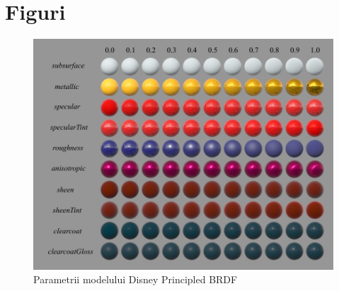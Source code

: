 \documentclass[12pt,a4paper]{report}
\numberwithin{equation}{section} %
\begin{document}
\begin{appendices}
	\label{anexa}

	\chapter{Figuri}

	\begin{figure}
		\centering
		\includegraphics[width=\textwidth]{pics/disney_params.png}
		\caption{Parametrii modelului Disney Principled BRDF~\cite{Disney}}
		\label{fig:disney_params}
	\end{figure}


\end{appendices}
\end{document}
